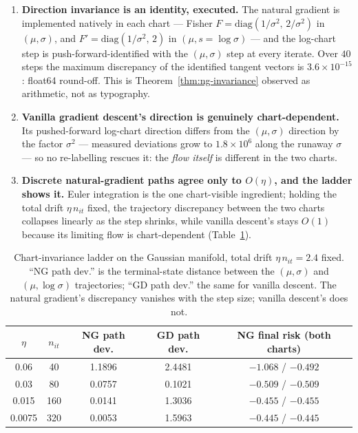 \begin{enumerate}
\item \textbf{Direction invariance is an identity, executed.}  The natural
gradient is implemented natively in each chart --- Fisher
$F=\mathrm{diag}(1/\sigma^{2},\,2/\sigma^{2})$ in $(\mu,\sigma)$, and
$F'=\mathrm{diag}(1/\sigma^{2},\,2)$ in $(\mu,s=\log\sigma)$ --- and the
log-chart step is push-forward-identified with the $(\mu,\sigma)$ step at
every iterate.  Over $40$ steps the maximum discrepancy of the identified
tangent vectors is $3.6\times10^{-15}$: float64 round-off.  This is
Theorem~\ref{thm:ng-invariance} observed as arithmetic, not as typography.
\item \textbf{Vanilla gradient descent's direction is genuinely
chart-dependent.}  Its pushed-forward log-chart direction differs from the
$(\mu,\sigma)$ direction by the factor $\sigma^{2}$ --- measured deviations
grow to $1.8\times10^{6}$ along the runaway $\sigma$ --- so no re-labelling
rescues it: the \emph{flow itself} is different in the two charts.
\item \textbf{Discrete natural-gradient paths agree only to $O(\eta)$, and
the ladder shows it.}  Euler integration is the one chart-visible
ingredient; holding the total drift $\eta\,n_{it}$ fixed, the trajectory
discrepancy between the two charts collapses linearly as the step shrinks,
while vanilla descent's stays $O(1)$ because its limiting flow is
chart-dependent (Table~\ref{tab:ng-invariance}).
\end{enumerate}

\begin{table}[h]
\centering
\caption{Chart-invariance ladder on the Gaussian manifold, total drift
$\eta\,n_{it}=2.4$ fixed.  ``NG path dev.'' is the terminal-state distance
between the $(\mu,\sigma)$ and $(\mu,\log\sigma)$ trajectories; ``GD path
dev.'' the same for vanilla descent.  The natural gradient's discrepancy
vanishes with the step size; vanilla descent's does not.}
\begin{tabular}{ccccc}
\toprule
$\eta$ & $n_{it}$ & \textbf{NG path dev.} & \textbf{GD path dev.} &
\textbf{NG final risk (both charts)} \\
\midrule
0.06     & 40  & 1.1896 & 2.4481 & $-1.068$ / $-0.492$ \\
0.03     & 80  & 0.0757 & 0.1021 & $-0.509$ / $-0.509$ \\
0.015    & 160 & 0.0141 & 1.3036 & $-0.455$ / $-0.455$ \\
0.0075   & 320 & 0.0053 & 1.5963 & $-0.445$ / $-0.445$ \\
\bottomrule
\end{tabular}
\label{tab:ng-invariance}
\end{table}

